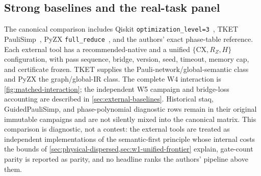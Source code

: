 \subsection{Strong baselines and the real-task panel}
The canonical comparison includes Qiskit
\texttt{optimization\_level=3}~\cite{javadi2024qiskit}, TKET
PauliSimp~\cite{sivarajah2021tket,cowtan2020phase}, PyZX
\texttt{full\_reduce}~\cite{kissinger2020pyzx}, and the authors' exact
phase-table reference.  Each external tool has a recommended-native and a
unified $\{\mathrm{CX},R_Z,H\}$ configuration, with pass sequence, bridge,
version, seed, timeout, memory cap, and certificate frozen.  TKET supplies the
Pauli-network/global-semantic class and PyZX the graph/global-IR class.  The
complete W4 interaction is \cref{fig:matched-interaction}; the independent W5
campaign and bridge-loss accounting are described in
\cref{sec:external-baselines}.  Historical staq, GuidedPauliSimp, and
phase-polynomial diagnostic rows remain in their original immutable campaigns
and are not silently mixed into the canonical matrix.  This comparison is
diagnostic, not a contest: the external tools are treated as independent
implementations of the semantic-first principle whose internal costs the
bounds of \cref{sec:physical-dispersed,sec:w1-unified-frontier} explain,
gate-count parity is reported as parity, and no headline ranks the
authors' pipeline above them.


